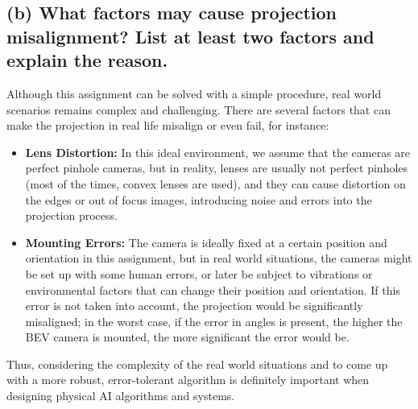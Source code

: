 \documentclass{article}
\begin{document}
\subsection{(b) What factors may cause projection misalignment? List at least two factors and explain the reason.}
Although this assignment can be solved with a simple procedure, real world scenarios remains complex and challenging. 
There are several factors that can make the projection in real life misalign or even fail, for instance:
\begin{itemize}
    \item \textbf{Lens Distortion:} In this ideal environment, we assume that the cameras are perfect pinhole cameras, but in reality, lenses 
    are usually not perfect pinholes (most of the times, convex lenses are used), and they can cause distortion on the edges or out of focus images, 
    introducing noise and errors into the projection process.
    \item \textbf{Mounting Errors:} The camera is ideally fixed at a certain position and orientation in this assignment, but in real world situations, 
    the cameras might be set up with some human errors, or later be subject to vibrations or environmental factors that can change their position and 
    orientation. If this error is not taken into account, the projection would be significantly 
    misaligned; in the worst case, if the error in angles is present, the higher the BEV camera is mounted, the more significant the error would be.
\end{itemize}
Thus, considering the complexity of the real world situations and to come up with a more robust, error-tolerant algorithm is 
definitely important when designing physical AI algorithms and systems.
\end{document}
